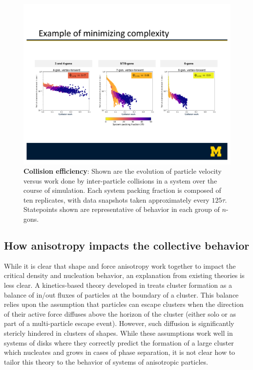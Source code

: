 
\begin{figure}[!t]
\begin{center}
\includegraphics[width=6.5in]{../Figures/Fig3.pdf}
\caption{
\textbf{Collision efficiency}:
Shown are the evolution of particle velocity versus work done by inter-particle collisions in a system over the course of simulation.
Each system packing fraction is composed of ten replicates, with data snapshots taken approximately every $125\tau$.
Statepoints shown are representative of behavior in each group of $n$-gons.
}
\label{fig:pressure}
\end{center}
\end{figure}

\subsection*{How anisotropy impacts the collective behavior}

While it is clear that shape and force anisotropy work together to impact the critical density and nucleation behavior, an explanation from existing theories is less clear. 
A kinetics-based theory developed in \cite{Redner_2016_PRL} treats cluster formation as a balance of in/out fluxes of particles at the boundary of a cluster.
This balance relies upon the assumption that particles can escape clusters when the direction of their active force diffuses above the horizon of the cluster (either solo or as part of a multi-particle escape event).
However, such diffusion is significantly stericly hindered in clusters of shapes.
While these assumptions work well in systems of disks where they correctly predict the formation of a large cluster which nucleates and grows in cases of phase separation, it is not clear how to tailor this theory to the behavior of systems of anisotropic particles. 

